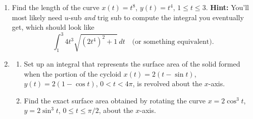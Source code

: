 \documentclass[12 pt]{article}
\begin{document}
\begin{enumerate}[leftmargin=0in, rightmargin=-0.25in]
	\item Find the length of the curve $x(t)=t^8$, $y(t)=t^4$, $1\leq t\leq 3$. \textbf{Hint: }You'll most likely need $u$-sub \textit{and} trig sub to compute the integral you eventually get, which should look like $$\int_1^3 4t^3\sqrt{(2t^4)^2+1}\,dt\quad\text{(or something equivalent)}.$$
	\vspace{0.25in}
	
	\item \begin{enumerate}[itemsep=0.5in]
		\item Set up an integral that represents the surface area of the solid formed when the portion of the cycloid $x(t)=2(t-\sin{t})$, $y(t)=2(1-\cos{t})$, $0<t<4\pi$, is revolved about the $x$-axis.
		\item Find the exact surface area obtained by rotating the curve $x=2\cos^3{t}$, $y=2\sin^3{t}$, $0\leq t\leq \pi/2$, about the $x$-axis.
	\end{enumerate}\vspace{0.25in}


\end{enumerate}
\end{document}
